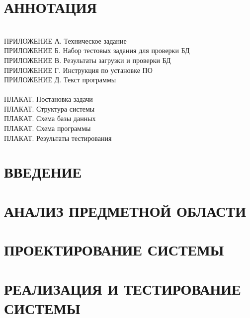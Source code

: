 

\newpage
\section*{АННОТАЦИЯ}


\newpage
{}
\tableofcontents
\hspace{0pt}\\
ПРИЛОЖЕНИЕ А. Техническое задание \\
ПРИЛОЖЕНИЕ Б. Набор тестовых задания для проверки БД \\
ПРИЛОЖЕНИЕ В. Результаты загрузки и проверки БД \\
ПРИЛОЖЕНИЕ Г. Инструкция по установке ПО \\
ПРИЛОЖЕНИЕ Д. Текст программы \\
\hspace{0pt}\\
ПЛАКАТ. Постановка задачи \\
ПЛАКАТ. Структура системы \\
ПЛАКАТ. Схема базы данных \\
ПЛАКАТ. Схема программы \\
ПЛАКАТ. Результаты тестирования \\

\newpage
{}
{}
\section*{ВВЕДЕНИЕ}


\section{АНАЛИЗ ПРЕДМЕТНОЙ ОБЛАСТИ}


\newpage
\section{ПРОЕКТИРОВАНИЕ СИСТЕМЫ}

% 
% 




\newpage
\section{РЕАЛИЗАЦИЯ И ТЕСТИРОВАНИЕ СИСТЕМЫ}


